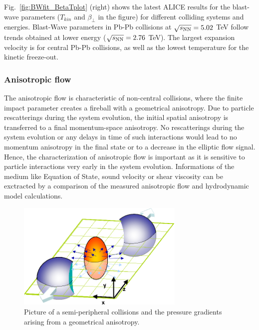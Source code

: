 Fig.~\ref{fig:BWfit_BetaTplot} (right) shows the latest ALICE results for the blast-wave parameters ($T_{kin}$ and $\beta_{\perp}$ in the figure) for different colliding systems and energies. Blast-Wave parameters in Pb-Pb collisions at $\sqrt{s_{\rm NN}} = 5.02$ TeV follow trends obtained at lower energy ($\sqrt{s_{\rm NN}} = 2.76$ TeV). The largest expansion velocity is for central Pb-Pb collisions, as well as the lowest temperature for the kinetic freeze-out.\\

\subsubsection{Anisotropic flow}
\label{sec:AnisotropicFlow}
The anisotropic flow is characteristic of non-central collisions, where the finite impact parameter creates a fireball with a geometrical anisotropy. Due to particle rescatterings during the system evolution, the initial spatial anisotropy is transferred to a final momentum-space anisotropy. No rescatterings during the system evolution or any delays in time of such interactions would lead to no momentum anisotropy in the final state or to a decrease in the elliptic flow signal. Hence, the characterization of anisotropic flow is important as it is sensitive to particle interactions very early in the system evolution. Informations of the medium like Equation of State, sound velocity or shear viscosity can be exctracted by a comparison of the measured anisotropic flow and hydrodynamic model calculations.
\begin{figure}[!ht]
  \centering
  \includegraphics[width=8cm]{FigCap1/elliptic_flow_3D_medium.png}
  \caption{Picture of a semi-peripheral collisions and the pressure gradients arising from a geometrical anisotropy.}
  \label{fig:elliptic_flow_3D_medium}
\end{figure}

